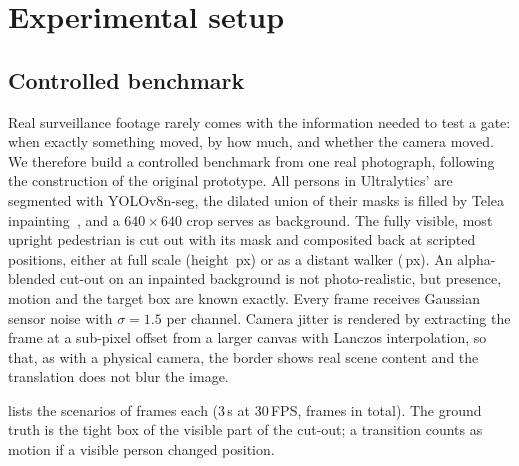 \section{Experimental setup}\label{sec:experiments}

\subsection{Controlled benchmark}\label{sec:benchmark}
Real surveillance footage rarely comes with the information needed to test a gate: when exactly something moved, by how much, and whether the camera moved. We therefore build a controlled benchmark from one real photograph, following the construction of the original prototype. All persons in Ultralytics'  are segmented with YOLOv8n-seg, the dilated union of their masks is filled by Telea inpainting~\cite{telea2004inpainting}, and a $640\times640$ crop serves as background. The fully visible, most upright pedestrian is cut out with its mask and composited back at scripted positions, either at full scale (height \HeightC\,px) or as a distant walker (\HeightB\,px). An alpha-blended cut-out on an inpainted background is not photo-realistic, but presence, motion and the target box are known exactly. Every frame receives Gaussian sensor noise with $\sigma=1.5$ per channel. Camera jitter is rendered by extracting the frame at a sub-pixel offset from a larger canvas with Lanczos interpolation, so that, as with a physical camera, the border shows real scene content and the translation does not blur the image.

 lists the \NScen{} scenarios of \NFramesScen{} frames each (3\,s at 30\,FPS, \NFramesCtrl{} frames in total). The ground truth is the tight box of the visible part of the cut-out; a transition counts as motion if a visible person changed position.

